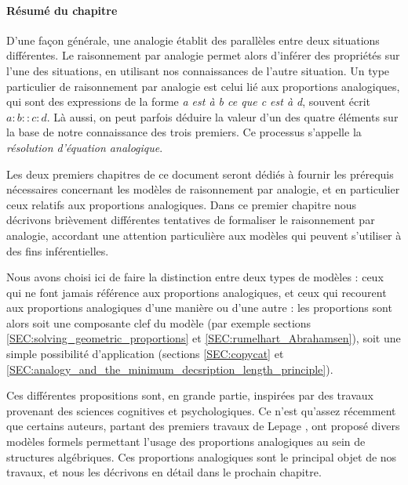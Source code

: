 \paragraph{Résumé du chapitre}

D'une façon générale, une analogie établit des parallèles entre deux situations
différentes. Le raisonnement par analogie permet alors d'inférer des propriétés
sur l'une des situations, en utilisant nos connaissances de l'autre situation.
Un type particulier de raisonnement par analogie est celui lié aux proportions
analogiques, qui sont des expressions de la forme \textit{a est à b ce que c
est à d}, souvent écrit $a:b::c:d$. Là aussi, on peut parfois déduire la valeur
d'un des quatre éléments sur la base de notre connaissance des trois premiers.
Ce processus s'appelle la \textit{résolution d'équation analogique}.

Les deux premiers chapitres de ce document seront dédiés à fournir les
prérequis nécessaires concernant les modèles de raisonnement par analogie, et
en particulier ceux relatifs aux proportions analogiques. Dans ce premier
chapitre nous décrivons brièvement différentes tentatives de formaliser le
raisonnement par analogie, accordant une attention particulière aux modèles qui
peuvent s'utiliser à des fins inférentielles.

Nous avons choisi ici de faire la distinction entre deux types de modèles :
ceux qui ne font jamais référence aux proportions analogiques, et ceux qui
recourent aux proportions analogiques d'une manière ou d'une autre : les
proportions sont alors soit une composante clef du modèle (par exemple sections
\ref{SEC:solving_geometric_proportions} et \ref{SEC:rumelhart_Abrahamsen}),
soit une simple possibilité d'application (sections \ref{SEC:copycat} et
\ref{SEC:analogy_and_the_minimum_decsription_length_principle}).

Ces différentes propositions sont, en grande partie, inspirées par des travaux
provenant des sciences cognitives et psychologiques. Ce n'est qu'assez
récemment que certains auteurs, partant des premiers travaux de Lepage
\cite{Lep04}, ont proposé divers modèles formels permettant l'usage des
proportions analogiques au sein de structures algébriques. Ces
proportions analogiques sont le principal objet de nos travaux, et nous les
décrivons en détail dans le prochain chapitre.
